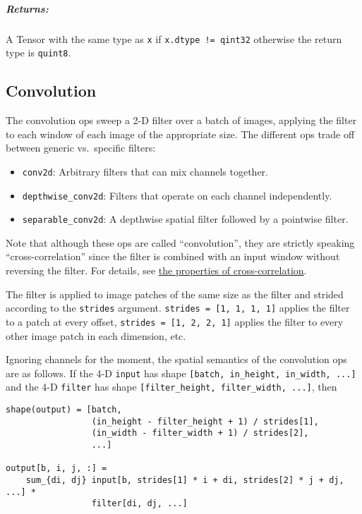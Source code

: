 \subparagraph{Returns: }\label{returns-6}

A Tensor with the same type as \texttt{x} if
\texttt{x.dtype\ !=\ qint32} otherwise the return type is
\texttt{quint8}.

\subsection{Convolution }\label{convolution}

The convolution ops sweep a 2-D filter over a batch of images, applying
the filter to each window of each image of the appropriate size. The
different ops trade off between generic vs.~specific filters:

\begin{itemize}
\tightlist
\item
  \texttt{conv2d}: Arbitrary filters that can mix channels together.
\item
  \texttt{depthwise\_conv2d}: Filters that operate on each channel
  independently.
\item
  \texttt{separable\_conv2d}: A depthwise spatial filter followed by a
  pointwise filter.
\end{itemize}

Note that although these ops are called ``convolution'', they are
strictly speaking ``cross-correlation'' since the filter is combined
with an input window without reversing the filter. For details, see
\href{https://en.wikipedia.org/wiki/Cross-correlation\#Properties}{the
properties of cross-correlation}.

The filter is applied to image patches of the same size as the filter
and strided according to the \texttt{strides} argument.
\texttt{strides\ =\ {[}1,\ 1,\ 1,\ 1{]}} applies the filter to a patch
at every offset, \texttt{strides\ =\ {[}1,\ 2,\ 2,\ 1{]}} applies the
filter to every other image patch in each dimension, etc.

Ignoring channels for the moment, the spatial semantics of the
convolution ops are as follows. If the 4-D \texttt{input} has shape
\texttt{{[}batch,\ in\_height,\ in\_width,\ ...{]}} and the 4-D
\texttt{filter} has shape
\texttt{{[}filter\_height,\ filter\_width,\ ...{]}}, then

\begin{verbatim}
shape(output) = [batch,
                 (in_height - filter_height + 1) / strides[1],
                 (in_width - filter_width + 1) / strides[2],
                 ...]

output[b, i, j, :] =
    sum_{di, dj} input[b, strides[1] * i + di, strides[2] * j + dj, ...] *
                 filter[di, dj, ...]
\end{verbatim}

